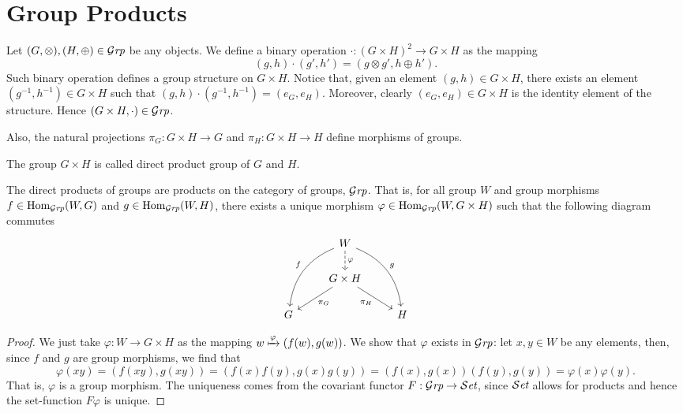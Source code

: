 \section{Group Products}

Let \((G, \otimes), (H, \oplus) \in {\mathcal{G}\textit{rp}}\) be any objects. We define a binary
operation \(\cdot: (G \times H)^2 \to G \times H\) as the mapping
\begin{equation}\label{eq: grp-prod-bin}
  (g, h) \cdot (g', h') = (g \otimes g', h \oplus h').
\end{equation}
Such binary operation defines a group structure on \(G \times H\). Notice that,
given an element \((g, h) \in G \times H\), there exists an element \((g^{-1},
h^{-1}) \in G \times H\) such that \((g, h) \cdot (g^{-1}, h^{-1}) = (e_G,
e_H)\). Moreover, clearly \((e_G, e_H) \in G \times H\) is the identity element
of the structure. Hence \((G \times H, \cdot) \in {\mathcal{G}\textit{rp}}\).

Also, the natural projections \(\pi_G: G \times H \to G\) and \(\pi_H: G \times
H \to H\) define morphisms of groups.

\begin{definition}
  The group \(G \times H\) is called direct product group of \(G\) and \(H\).
\end{definition}

\begin{proposition}
  The direct products of groups are products on the category of groups,
  \({\mathcal{G}\textit{rp}}\). That is, for all group \(W\) and group morphisms \(f \in
  \operatorname{Hom}_{\mathcal{G}\textit{rp}}(W, G)\) and \(g \in \operatorname{Hom}_{\mathcal{G}\textit{rp}}(W, H)\), there exists a unique
  morphism \(\varphi \in \operatorname{Hom}_{\mathcal{G}\textit{rp}}(W, G \times H)\) such that the following
  diagram commutes
  \[
    \begin{tikzcd}
      &W
      \ar[d, dashed, "\varphi"]
      \ar[ddr, bend left, "g"]
      \ar[ddl, swap, bend right, "f"]
      & \\
      &G \times H \ar[dr, swap, "\pi_H"] \ar[dl, "\pi_G"] & \\
      G & &H
    \end{tikzcd}
  \]
\end{proposition}

\begin{proof}
  We just take \(\varphi: W \to G \times H\) as the mapping \(w \xmapsto \varphi
  (f(w), g(w))\). We show that \(\varphi\) exists in \({\mathcal{G}\textit{rp}}\): let \(x, y \in
  W\) be any elements, then, since \(f\) and \(g\) are group morphisms, we find
  that
  \[
    \varphi(xy) = (f(xy), g(xy)) = (f(x) f(y), g(x) g(y))
    = (f(x), g(x)) (f(y), g(y)) = \varphi(x) \varphi(y).
  \]
  That is, \(\varphi\) is a group morphism. The uniqueness comes from the
  covariant functor \(F: {\mathcal{G}\textit{rp}} \to {\mathcal{S}\textit{et}}\), since \({\mathcal{S}\textit{et}}\) allows for products and
  hence the set-function \(F \varphi\) is unique.
\end{proof}

